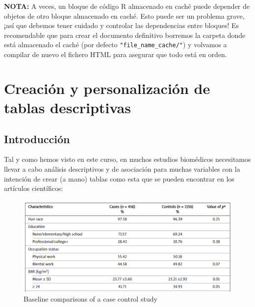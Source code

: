 \documentclass[
]{book}
\begin{document}
\textbf{NOTA:} A veces, un bloque de código R almacenado en caché puede depender de objetos de otro bloque almacenado en caché. Esto puede ser un problema grave, ¡así que debemos tener cuidado y controlar las dependencias entre bloques! Es recomendable que para crear el documento definitivo borremos la carpeta donde está almacenado el caché (por defecto \texttt{"file\_name\_cache/"}) y volvamos a compilar de nuevo el fichero HTML para asegurar que todo está en orden.

\hypertarget{creaciuxf3n-y-personalizaciuxf3n-de-tablas-descriptivas}{%
\chapter{Creación y personalización de tablas descriptivas}\label{creaciuxf3n-y-personalizaciuxf3n-de-tablas-descriptivas}}

\hypertarget{introducciuxf3n-2}{%
\section{Introducción}\label{introducciuxf3n-2}}

Tal y como hemos visto en este curso, en muchos estudios biomédicos necesitamos llevar a cabo análisis descriptivos y de asociación para muchas variables con la intención de crear (a mano) tablas como esta que se pueden encontrar en los artículos científicos:

\begin{figure}
\centering
\includegraphics{figures/table3.png}
\caption{Baseline comparisons of a case control study}
\end{figure}
\end{document}
